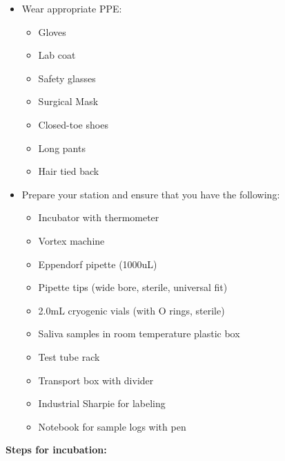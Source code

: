 \documentclass[]{book}
\providecommand{\tightlist}{%
  \setlength{\itemsep}{0pt}\setlength{\parskip}{0pt}}
\begin{document}
\begin{itemize}
\item
  Wear appropriate PPE:

  \begin{itemize}
  \tightlist
  \item
    Gloves
  \item
    Lab coat
  \item
    Safety glasses
  \item
    Surgical Mask
  \item
    Closed-toe shoes
  \item
    Long pants
  \item
    Hair tied back
  \end{itemize}
\item
  Prepare your station and ensure that you have the following:

  \begin{itemize}
  \tightlist
  \item
    Incubator with thermometer
  \item
    Vortex machine
  \item
    Eppendorf pipette (1000uL)
  \item
    Pipette tips (wide bore, sterile, universal fit)
  \item
    2.0mL cryogenic vials (with O rings, sterile)
  \item
    Saliva samples in room temperature plastic box\\
  \item
    Test tube rack
  \item
    Transport box with divider
  \item
    Industrial Sharpie for labeling
  \item
    Notebook for sample logs with pen
  \end{itemize}
\end{itemize}

\textbf{Steps for incubation:}
\end{document}
